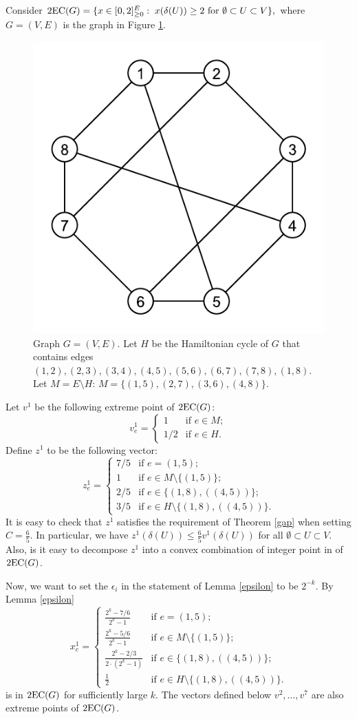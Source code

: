 \begin{example}

Consider  $\operatorname{2EC}(G) = \{x\in [0,2]^E_{\geq 0}: \; x(\delta(U))\geq 2 \mbox{ for $\emptyset \subset U \subset V$}\},$ where $G=(V,E)$ is the graph in Figure \ref{example}. 
\begin{figure}[h]
	\centering
	\includegraphics[width=0.2\linewidth]{example.pdf}
	\caption{Graph $G=(V,E)$. Let $H$ be the Hamiltonian cycle of $G$ that contains edges $(1,2),(2,3),(3,4),(4,5),(5,6),(6,7),(7,8),(1,8)$. Let $M= E\setminus H$: $M=\{(1,5),(2,7),(3,6),(4,8)\}$.}
	\label{example}
\end{figure}

Let $v^1$ be the following extreme point of $\operatorname{2EC}(G)$: \begin{equation*}
v^1_{e} = \left\{ \begin{array}{ll}
1 & \mbox{if $e\in M$};\\
1/2 & \mbox{if $e\in H$}.
\end{array} \right. 
\end{equation*}
Define $z^1$ to be the following vector:
\begin{equation*}
z^1_{e} = \left\{ \begin{array}{ll}
7/5 & \mbox{if $e= (1,5)$};\\
1 & \mbox{if $e\in M\setminus \{(1,5)\}$};\\
2/5 & \mbox{if $e \in \{(1,8),((4,5))\}$};\\
3/5 & \mbox{if $e\in H\setminus\{(1,8),((4,5))\} $}.
\end{array} \right. 
\end{equation*}
It is easy to check that $z^1$ satisfies the requirement of Theorem \ref{gap} when setting $C=\frac{6}{5}$. In particular, we have $ z^1(\delta(U))\leq \frac{6}{5}v^1(\delta(U))$ for all $\emptyset\subset U \subset V$. Also, is it easy to decompose $z^1$ into a convex combination of integer point in of $\operatorname{2EC}(G)$.

Now, we want to set the $\epsilon_i$ in the statement of Lemma \ref{epsilon} to be $2^{-k}$. By Lemma \ref{epsilon}
\begin{equation*}
x^1_{e} = \left\{ \begin{array}{ll}
\frac{2^k-7/6}{2^k-1} & \mbox{if $e= (1,5)$};\\
\frac{2^k-5/6}{2^k-1} & \mbox{if $e\in M\setminus \{(1,5)\}$};\\
\frac{2^k- 2/3}{2\cdot (2^k-1)} & \mbox{if $e \in \{(1,8),((4,5))\}$};\\
\frac{1}{2} & \mbox{if $e\in H\setminus\{(1,8),((4,5))\} $}.
\end{array} \right. 
\end{equation*}
is in $\operatorname{2EC}(G)$ for sufficiently large $k$. The vectors defined below $v^2,\ldots,v^7$ are also extreme points of $\operatorname{2EC}(G)$.


\end{example}
